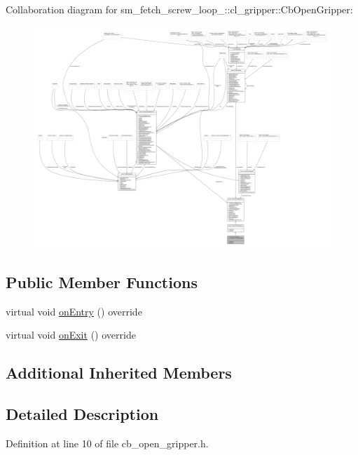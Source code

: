 Collaboration diagram for sm\+\_\+fetch\+\_\+screw\+\_\+loop\+\_\+:\+:cl\+\_\+gripper\+:\+:Cb\+Open\+Gripper\+:
\nopagebreak
\begin{figure}[H]
\begin{center}
\leavevmode
\includegraphics[width=350pt]{classsm__fetch__screw__loop__1_1_1cl__gripper_1_1CbOpenGripper__coll__graph}
\end{center}
\end{figure}
\subsection*{Public Member Functions}
\begin{DoxyCompactItemize}
\item 
virtual void \hyperlink{classsm__fetch__screw__loop__1_1_1cl__gripper_1_1CbOpenGripper_a2d50cf912c699839eda7c15a490e0b9f}{on\+Entry} () override
\item 
virtual void \hyperlink{classsm__fetch__screw__loop__1_1_1cl__gripper_1_1CbOpenGripper_aef1b4dc2e4a1044d17a22fa59bcc845e}{on\+Exit} () override
\end{DoxyCompactItemize}
\subsection*{Additional Inherited Members}


\subsection{Detailed Description}


Definition at line 10 of file cb\+\_\+open\+\_\+gripper.\+h.



